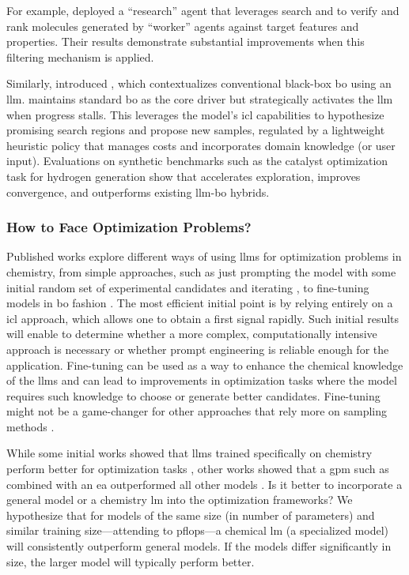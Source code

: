 For example, \textcite{yu2025collaborative} deployed a \enquote{research} agent that leverages  search and  to verify and rank molecules generated by \enquote{worker} agents against target features and properties. 
Their results demonstrate substantial improvements when this filtering mechanism is applied.

Similarly, \textcite{cisse2025language0based} introduced , which contextualizes conventional black-box \gls{bo} using an \gls{llm}.  maintains standard \gls{bo} as the core driver but strategically activates the \gls{llm} when progress stalls. 
This leverages the model’s \gls{icl} capabilities to hypothesize promising search regions and propose new samples, regulated by a lightweight heuristic policy that manages costs and incorporates domain knowledge (or user input). 
Evaluations on synthetic benchmarks such as the catalyst optimization task for hydrogen generation show that  accelerates exploration, improves convergence, and outperforms existing \gls{llm}-\gls{bo} hybrids.

\subsubsection{How to Face Optimization Problems?}

Published works explore different ways of using \glspl{llm} for optimization problems in chemistry, from simple approaches, such as just prompting the model with some initial random set of experimental candidates and iterating \autocite{ramos2023bayesian}, to fine-tuning models in \gls{bo} fashion \autocite{rankovic2025gollum0}. 
The most efficient initial point is by relying entirely on a \gls{icl} approach, which allows one to obtain a first signal rapidly. 
Such initial results will enable to determine whether a more complex, computationally intensive approach is necessary or whether prompt engineering is reliable enough for the application. 
Fine-tuning can be used as a way to enhance the chemical knowledge of the \glspl{llm} and can lead to improvements in optimization tasks where the model requires such knowledge to choose or generate better candidates. 
Fine-tuning might not be a game-changer for other approaches that rely more on sampling methods \autocite{wang2025llm0augmented}.

While some initial works showed that \glspl{llm} trained specifically on chemistry perform better for optimization tasks \autocite{kristiadi2024sober}, other works showed that a \gls{gpm} such as  combined with an \gls{ea} outperformed all other models \autocite{wang2024efficient}.
Is it better to incorporate a general model or a chemistry \gls{lm} into the optimization frameworks?
We hypothesize that for models of the same size (in number of parameters) and similar training size---attending to \glspl{pflop}---a chemical \gls{lm} (a specialized model) will consistently outperform general models. 
If the models differ significantly in size, the larger model will typically perform better.
